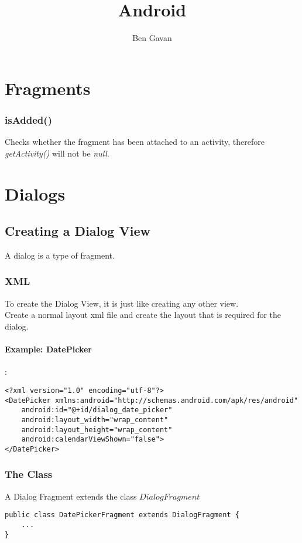 \documentclass[]{article}
\title{Android}
\author{Ben Gavan}
\begin{document}
\maketitle
\tableofcontents

\section{Fragments}
\subsubsection{isAdded()}
Checks whether the fragment has been attached to an activity, therefore \textit{getActivity()} will not be \textit{null}.

\section{Dialogs}
\subsection{Creating a Dialog View}
A dialog is a type of fragment.
\subsubsection{XML}
To create the Dialog View, it is just like creating any other view.
\\
Create a normal layout xml file and create the layout that is required for the dialog.
\paragraph{Example: DatePicker}:
\begin{lstlisting}
<?xml version="1.0" encoding="utf-8"?>
<DatePicker xmlns:android="http://schemas.android.com/apk/res/android"
	android:id="@+id/dialog_date_picker"
	android:layout_width="wrap_content"
	android:layout_height="wrap_content"
	android:calendarViewShown="false">
</DatePicker>
\end{lstlisting}

\subsubsection{The Class}
A Dialog Fragment extends the class $DialogFragment$
\begin{lstlisting}
public class DatePickerFragment extends DialogFragment {
	...
}
\end{lstlisting}
\end{document}
